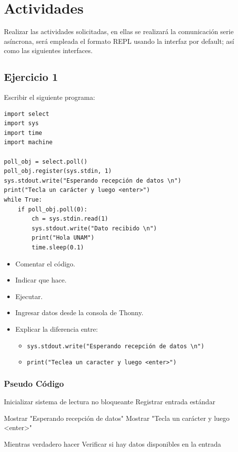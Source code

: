 \section{Actividades}
Realizar las actividades solicitadas, en ellas se realizará la comunicación serie asíncrona, será empleada el formato REPL usando la interfaz por default; así como las siguientes interfaces.

\subsection{Ejercicio 1}
Escribir el siguiente programa:

\begin{lstlisting}
import select
import sys
import time
import machine

poll_obj = select.poll()
poll_obj.register(sys.stdin, 1)
sys.stdout.write("Esperando recepción de datos \n")
print("Tecla un carácter y luego <enter>")
while True:
    if poll_obj.poll(0):
        ch = sys.stdin.read(1)
        sys.stdout.write("Dato recibido \n")
        print("Hola UNAM")
        time.sleep(0.1)
\end{lstlisting}

\begin{itemize}
    \item [a] Comentar el código.
    \item [b] Indicar que hace.
    \item [c] Ejecutar.
    \item [d] Ingresar datos desde la consola de Thonny.
    \item [e] Explicar la diferencia entre:
    \begin{itemize}
        \item [a] \texttt{sys.stdout.write("Esperando recepción de datos \textbackslash n")}
        \item [b] \texttt{print("Teclea un caracter y luego <enter>")}
\end{itemize}
\end{itemize}

\subsubsection{Pseudo Código}

\begin{algorithm}[H]
\SetAlgoLined
\caption{Lectura de datos desde entrada estándar}

Inicializar sistema de lectura no bloqueante\;
Registrar entrada estándar\;

Mostrar "Esperando recepción de datos"\;
Mostrar "Tecla un carácter y luego <enter>"\;

Mientras verdadero hacer\;
\Indp
    Verificar si hay datos disponibles en la entrada\;
    
\Indm

\end{algorithm}

